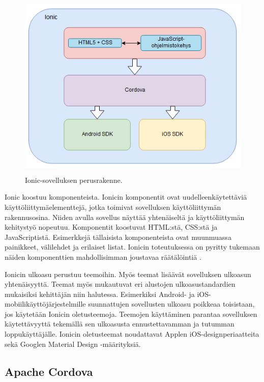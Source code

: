 \documentclass[utf8]{gradu3}
\begin{document}
\begin{figure}[h]\centering
  \includegraphics[height=9cm,keepaspectratio]{ionic-structure}
  \caption[Ionic-sovelluksen perusrakenne]
  {Ionic-sovelluksen perusrakenne.}
  \label{fig:ionic-structure}
\end{figure}

Ionic koostuu komponenteista. Ionicin komponentit ovat uudelleenkäytettäviä käyttöliittymäelementtejä, jotka toimivat sovelluksen käyttöliittymän rakennusosina. Niiden avulla sovellus näyttää yhtenäiseltä ja käyttöliittymän kehitystyö nopeutuu. Komponentit koostuvat HTML:stä, CSS:stä ja JavaScriptistä. Esimerkkejä tällaisista komponenteista ovat muunmuassa painikkeet, välilehdet ja erilaiset listat. Ionicin toteutuksessa on pyritty tukemaan näiden komponenttien mahdollisimman joustavaa räätälöintiä \parencite[]{ionic-documentation}.

Ionicin ulkoasu perustuu teemoihin. Myös teemat lisäävät sovelluksen ulkoasun yhtenäisyyttä. Teemat myös mukautuvat eri alustojen ulkoasustandardien mukaisiksi kehittäjän niin halutessa. Esimerkiksi Android- ja iOS-mobiilikäyttöjärjestelmille suunnattujen sovellusten ulkoasu poikkeaa toisistaan, jos käytetään Ionicin oletusteemoja. Teemojen käyttäminen parantaa sovelluksen käytettävyyttä tekemällä sen ulkoasusta ennustettavamman ja tutumman loppukäyttäjälle. Ionicin oletusteemat noudattavat Applen iOS-designperiaatteita sekä Googlen Material Design -määrityksiä.

\subsection{Apache Cordova}
\end{document}
